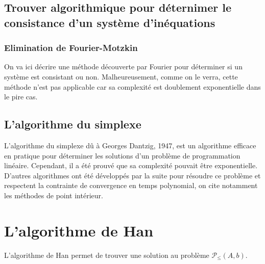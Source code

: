 \documentclass[10pt,a4paper]{article}
\begin{document}
\subsection{Trouver algorithmique pour déternimer le consistance d'un système d'inéquations}

\subsubsection{Elimination de Fourier-Motzkin}
On va ici décrire une méthode découverte par Fourier pour déterminer si un système est consistant ou non.
Malheureusement, comme on le verra, cette méthode n'est pas applicable car sa complexité est doublement exponentielle dans le pire cas.

\subsection{L'algorithme du simplexe}
L'algorithme du simplexe dû à Georges Dantzig, 1947, est un algorithme efficace en pratique pour déterminer les solutions d'un problème de programmation linéaire.
Cependant, il a été prouvé que sa complexité pouvait être exponentielle.
D'autres algorithmes ont été développés par la suite pour résoudre ce problème et respectent la contrainte de convergence en temps polynomial, on cite notamment les méthodes de point intérieur.

\section{L'algorithme de Han}

L'algorithme de Han permet de trouver une solution au problème $\mathcal{P}_{\leq}(A,b)$.
\end{document}
